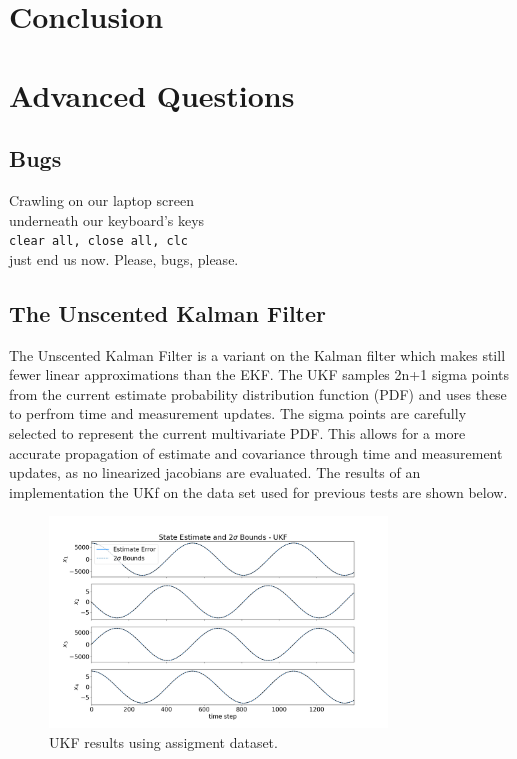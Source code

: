 \documentclass[11pt, a4paper]{article}
\begin{document}
\section{Conclusion}

\section{Advanced Questions}
\subsection{Bugs}
Crawling on our laptop screen \\
underneath our keyboard's keys \\
\texttt{clear all, close all, clc} \\
just end us now. Please, bugs, please. \\
 
\subsection{The Unscented Kalman Filter}
The Unscented Kalman Filter is a variant on the Kalman filter which makes still fewer linear approximations than the EKF. 
The UKF samples 2n+1 sigma points from the current estimate probability distribution function (PDF) and uses these to perfrom time and measurement updates.
The sigma points are carefully selected to represent the current multivariate PDF. 
This allows for a more accurate propagation of estimate and covariance through time and measurement updates, as no linearized jacobians are evaluated. 
The results of an implementation the UKf on the data set used for previous tests are shown below.

\begin{figure}[H]
	\centering
	\includegraphics[width=0.8\textwidth]{Figures/ukf_dataset_est.png}
	\caption{UKF results using assigment dataset.}
	\label{fig:ukf_dataset}
\end{figure}
\end{document}
